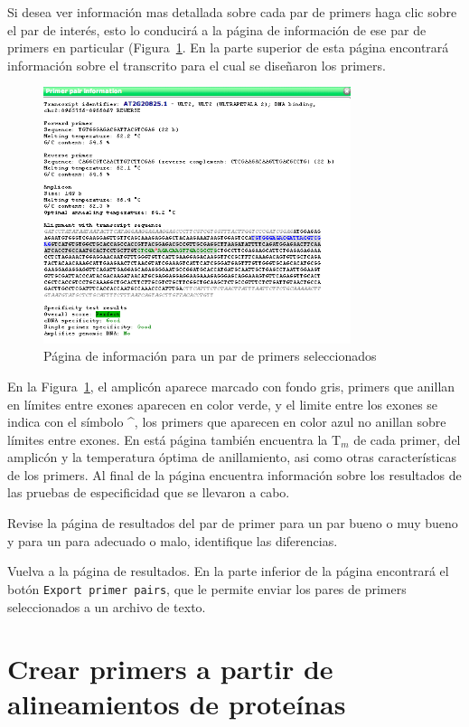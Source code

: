 \documentclass[letter,11pt]{book}
\begin{document}
Si desea ver información mas detallada sobre cada par de primers haga clic sobre el par de interés, esto lo conducirá a la página de información de ese par de primers en particular (Figura~\ref{fig:QP_primerinfo}. En la parte superior de esta página encontrará información sobre el transcrito para el cual se diseñaron los primers.

\begin{figure}[h!]
\centering
 \includegraphics[width=9cm]{Figs/QP_primerinfo.png}
 \caption{\label{fig:QP_primerinfo}Página de información para un par de primers seleccionados}
\end{figure}

En la Figura~\ref{fig:QP_primerinfo}, el amplicón aparece marcado con fondo gris, primers que anillan en límites entre exones aparecen en color verde, y el limite entre los exones se indica con el símbolo \textasciicircum, los primers que aparecen en color azul no anillan sobre límites entre exones. En está página también encuentra la T$_m$ de cada primer, del amplicón y la temperatura óptima de anillamiento, asi como otras características de los primers. Al final de la página encuentra información sobre los resultados de las pruebas de especificidad que se llevaron  a cabo.

Revise la página de resultados del par de primer para un par bueno o muy bueno y para un para adecuado o malo, identifique las diferencias.

Vuelva a la página de resultados. En la parte inferior de la página encontrará el botón \Verb+Export primer pairs+, que le permite enviar los pares de primers seleccionados a un archivo de texto.

\section{Crear primers a partir de alineamientos de proteínas}
\end{document}
